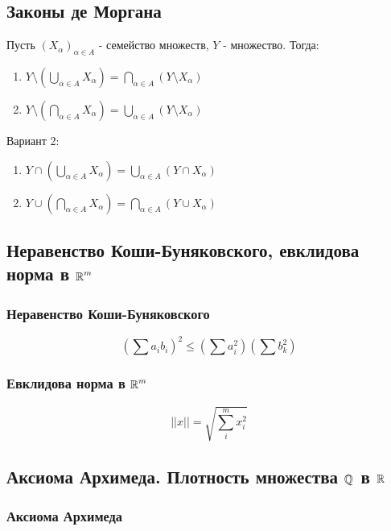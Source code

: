 \subsection{Законы де Моргана}

Пусть $(X_\alpha)_{\alpha \in A}$ - семейство множеств, $Y$ - множество. Тогда:

\begin{enumerate}
    \item $Y\setminus(\bigcup\limits_{\alpha \in A}X_\alpha) = \bigcap\limits_{\alpha \in A}(Y\setminus X_\alpha)$
    \item $Y\setminus(\bigcap\limits_{\alpha \in A}X_\alpha) = \bigcup\limits_{\alpha \in A}(Y\setminus X_\alpha)$
\end{enumerate}

Вариант 2:

\begin{enumerate}
    \item $Y\cap(\bigcup\limits_{\alpha \in A}X_\alpha) = \bigcup\limits_{\alpha \in A}(Y\cap X_\alpha)$
    \item $Y\cup(\bigcap\limits_{\alpha \in A}X_\alpha) = \bigcap\limits_{\alpha \in A}(Y\cup X_\alpha)$
\end{enumerate}

\subsection{Неравенство Коши-Буняковского, евклидова норма в $\operatorname*{\mathbb{R}}^m$}

\subsubsection{Неравенство Коши-Буняковского}

$$(\sum a_ib_i)^2 \leq (\sum a_i^2)(\sum b_k^2)$$

\subsubsection{Евклидова норма в $\operatorname*{\mathbb{R}}^m$}

$$||x||=\sqrt{\sum\limits_{i}^m x_i^2}$$

\subsection{Аксиома Архимеда. Плотность множества $\operatorname*{\mathbb{Q}}$ в $\operatorname*{\mathbb{R}}$}

\subsubsection{Аксиома Архимеда}

